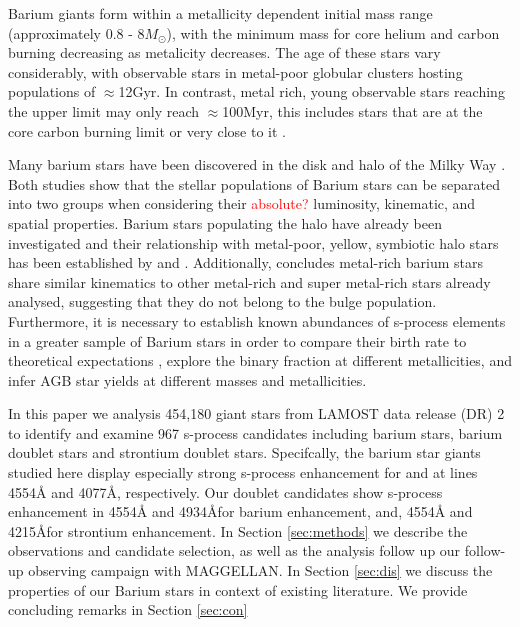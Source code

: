 \documentclass[a4paper,fleqn,usenatbib]{mnras}
\newcommand{\todo}[1]{\textcolor{red}{#1}}
\begin{document}
Barium giants form within a metallicity dependent initial mass range (approximately 0.8 - 8$M_{\odot}$), with the minimum mass for core helium and carbon burning decreasing as metalicity decreases. The age of these stars vary considerably, with observable stars in metal-poor globular clusters hosting populations of $\approx$12Gyr. In contrast, metal rich, young observable stars reaching the upper limit may only reach $\approx$100Myr, this includes stars that are at the core carbon burning limit or very close to it \citep[e.g.][]{whitelock2013}.

Many barium stars have been discovered in the disk and halo of the Milky Way \citep{gomez1997,mennessier1997}. Both studies show that the stellar populations of Barium stars can be separated into two groups when considering their \todo{absolute?} luminosity, kinematic, and spatial properties. Barium stars populating the halo have already been investigated \citep[e.g.][]{junqueira2001,drake2008,pereira2009,allen2006} and their relationship with metal-poor, yellow, symbiotic halo stars has been established by \citet{jorissen2005} and \citet{pereira2009}. Additionally, \citet{pereira2011} concludes metal-rich barium stars share similar kinematics to other metal-rich and super metal-rich stars already analysed, suggesting that they do not belong to the bulge population. Furthermore, it is necessary to establish known abundances of s-process elements in a greater sample of Barium stars in order to compare their birth rate to theoretical expectations \citep{han1995}, explore the binary fraction at different metallicities, and infer AGB star yields at different masses and metallicities.

In this paper we analysis 454,180 giant stars from LAMOST data release (DR) 2 to identify and examine 967 s-process candidates including barium stars, barium doublet stars and strontium doublet stars. Specifcally, the barium star giants studied here display especially strong s-process enhancement for  and  at lines 4554\AA \hspace{0.2mm} and 4077\AA, respectively. Our doublet candidates show s-process enhancement in 4554\AA \hspace{0.2mm} and 4934\AA for barium enhancement, and, 4554\AA \hspace{0.2mm} and 4215\AA for strontium enhancement. In Section \ref{sec:methods} we describe the observations and candidate selection, as well as the analysis follow up our follow-up observing campaign with MAGGELLAN. In Section \ref{sec:dis} we discuss the properties of our Barium stars in context of existing literature. We provide concluding remarks in Section \ref{sec:con}
\end{document}
